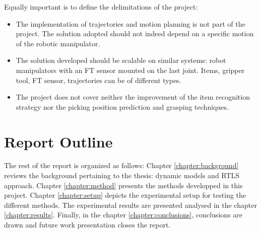 \documentclass[/home/francois/latex/report/main.tex]{subfiles}
\begin{document}
Equally important is to define the delimitations of the project:

\begin{itemize}
	\item The implementation of trajectories and motion planning is not part of the project. The solution adopted should not indeed depend on a specific motion of the robotic manipulator.
	\item The solution developed should be scalable on similar systems: robot manipulators with an \ac{FT} sensor mounted on the last joint. Items, gripper tool, \ac{FT} sensor, trajectories can be of different types.
	\item The project does not cover neither the improvement of the item recognition strategy nor the picking position prediction and grasping techniques.
\end{itemize}


\section{Report Outline}

The rest of the report is organized as follows: Chapter \ref{chapter:background} reviews the background pertaining to the thesis: dynamic models and \ac{RTLS} approach. Chapter \ref{chapter:method} presents the methods developped in this project. Chapter \ref{chapter:setup} depicts the experimental setup for testing the different methods. The experimental results are presented analysed in the chapter \ref{chapter:results}. Finally, in the chapter \ref{chapter:conclusions}, conclusions are drawn and future work presentation closes the report.
\end{document}
